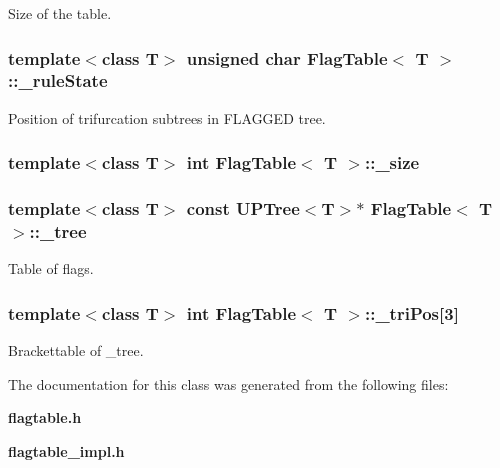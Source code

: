 Size of the table. 

\subsubsection{\setlength{\rightskip}{0pt plus 5cm}template$<$class T$>$ unsigned char {\bf Flag\-Table}$<$ T $>$::{\bf \_\-rule\-State}\hspace{0.3cm}{\tt  [protected]}}\label{classFlagTable_p6}


Position of trifurcation subtrees in FLAGGED tree. 

\subsubsection{\setlength{\rightskip}{0pt plus 5cm}template$<$class T$>$ int {\bf Flag\-Table}$<$ T $>$::{\bf \_\-size}\hspace{0.3cm}{\tt  [protected]}}\label{classFlagTable_p0}


\subsubsection{\setlength{\rightskip}{0pt plus 5cm}template$<$class T$>$ const {\bf UPTree}$<$T$>$$\ast$ {\bf Flag\-Table}$<$ T $>$::{\bf \_\-tree}\hspace{0.3cm}{\tt  [protected]}}\label{classFlagTable_p3}


Table of flags. 

\subsubsection{\setlength{\rightskip}{0pt plus 5cm}template$<$class T$>$ int {\bf Flag\-Table}$<$ T $>$::{\bf \_\-tri\-Pos}[3]\hspace{0.3cm}{\tt  [protected]}}\label{classFlagTable_p5}


Brackettable of \_\-tree. 



The documentation for this class was generated from the following files:\begin{CompactItemize}
\item 
{\bf flagtable.h}\item 
{\bf flagtable\_\-impl.h}\end{CompactItemize}
